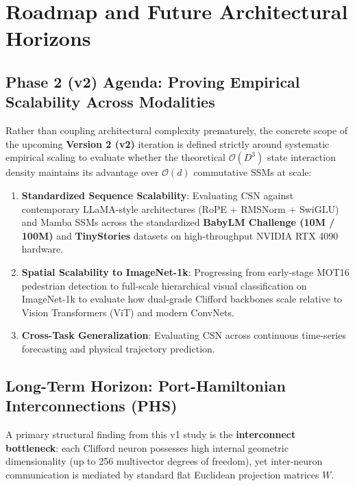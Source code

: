 \documentclass[11pt,a4paper]{article}
\begin{document}
\section{Roadmap and Future Architectural Horizons}

\subsection{Phase 2 (v2) Agenda: Proving Empirical Scalability Across Modalities}

Rather than coupling architectural complexity prematurely, the concrete scope of the upcoming \textbf{Version 2 (v2)} iteration is defined strictly around systematic empirical scaling to evaluate whether the theoretical $\mathcal{O}(D^3)$ state interaction density maintains its advantage over $\mathcal{O}(d)$ commutative SSMs at scale:
\begin{enumerate}[leftmargin=*]
    \item \textbf{Standardized Sequence Scalability}: Evaluating CSN against contemporary LLaMA-style architectures (RoPE + RMSNorm + SwiGLU) and Mamba SSMs across the standardized \textbf{BabyLM Challenge (10M / 100M)} and \textbf{TinyStories} datasets on high-throughput NVIDIA RTX 4090 hardware.
    \item \textbf{Spatial Scalability to ImageNet-1k}: Progressing from early-stage MOT16 pedestrian detection to full-scale hierarchical visual classification on ImageNet-1k to evaluate how dual-grade Clifford backbones scale relative to Vision Transformers (ViT) and modern ConvNets.
    \item \textbf{Cross-Task Generalization}: Evaluating CSN across continuous time-series forecasting and physical trajectory prediction.
\end{enumerate}

\subsection{Long-Term Horizon: Port-Hamiltonian Interconnections (PHS)}

A primary structural finding from this v1 study is the \textbf{interconnect bottleneck}: each Clifford neuron possesses high internal geometric dimensionality (up to 256 multivector degrees of freedom), yet inter-neuron communication is mediated by standard flat Euclidean projection matrices $W$. 
\end{document}
